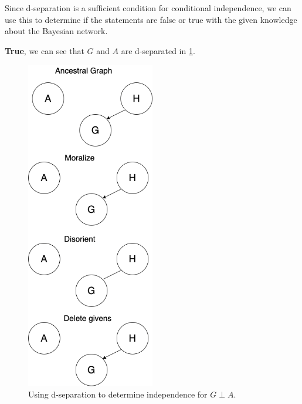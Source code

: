 \documentclass[10pt, a4paper, english]{../Template/NTNUoving}
\begin{document}
\begin{oppgave}
    Since d-separation is a sufficient condition for conditional independence, we can use this to determine if the statements are false or true with the given knowledge about the Bayesian network.

    \begin{punkt}
        \textbf{True}, we can see that $G$ and $A$ are d-separated in \ref{fig:2b}.
        \begin{figure}[H]
            \centering
            \includegraphics[width=0.5\textwidth]{Task2b.png}
            \caption{Using d-separation to determine independence for $G \perp A$.}
            \label{fig:2b}
            \end{figure}
    \end{punkt}


\end{oppgave}
\end{document}
